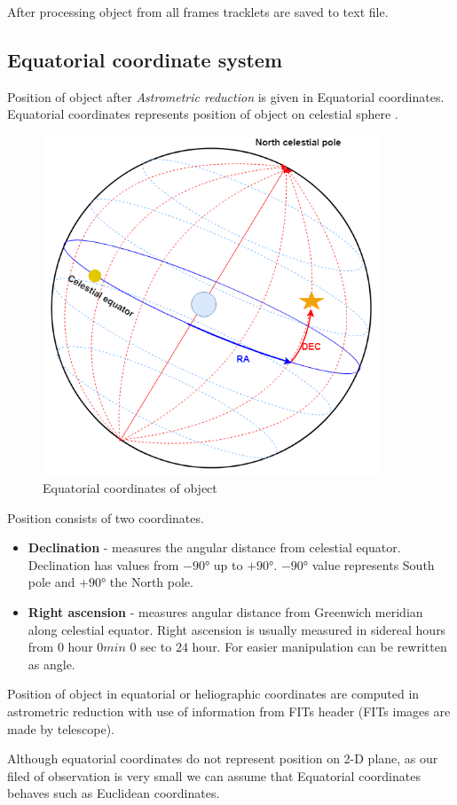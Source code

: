 After processing object from all frames tracklets are saved to text file. 


\subsection{Equatorial coordinate system}

Position of object after \textit{Astrometric reduction} is given in Equatorial coordinates. Equatorial coordinates represents position  of object on celestial sphere \cite{thompson2006coordinate} . 

\begin{figure}[!h]
    \centering
    \includegraphics[width=100mm]{chapters/images/equatorial_coordinates.png}
    \caption{Equatorial coordinates of object}
    \label{fig:Equatorial_coordinates}
\end{figure}

Position consists of two coordinates. 
\begin{itemize}
    \item \textbf{Declination} - measures the angular distance from celestial equator. Declination has values from $-90°$ up to $+90°$. $-90°$ value represents South pole and $+90°$ the North pole.
    \item \textbf{Right ascension} - measures angular distance from Greenwich meridian along celestial equator. Right ascension is usually measured in sidereal hours from $0$ hour $0 min$ $0$ sec to $24$ hour. For easier manipulation can be rewritten as angle.
\end{itemize}

Position of object in equatorial or heliographic coordinates are computed in astrometric reduction with use of information from FITs header (FITs images are made by telescope).

Although equatorial coordinates do not represent position on 2-D plane, as our filed of observation is very small we can assume that Equatorial coordinates behaves such as Euclidean coordinates. 
